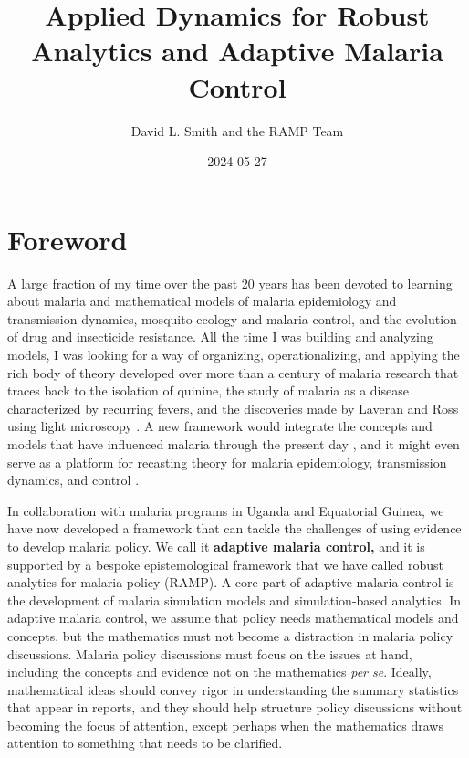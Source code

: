 \documentclass[
]{book}
\title{Applied Dynamics for Robust Analytics and Adaptive Malaria Control}
\author{David L. Smith and the RAMP Team}
\date{2024-05-27}
\begin{document}
\maketitle

{
\setcounter{tocdepth}{2}
\tableofcontents
}
\chapter*{Foreword}\label{foreword}

A large fraction of my time over the past 20 years has been devoted to learning about malaria and mathematical models of malaria epidemiology and transmission dynamics, mosquito ecology and malaria control, and the evolution of drug and insecticide resistance.
All the time I was building and analyzing models, I was looking for a way of organizing, operationalizing, and applying the rich body of theory developed over more than a century of malaria research that traces back to the isolation of quinine, the study of malaria as a disease characterized by recurring fevers, and the discoveries made by Laveran and Ross using light microscopy
\autocite{RossR1911Book,SmithDL2012_RossMacdonald}.
A new framework would integrate the concepts and models that have influenced malaria through the present day \autocite{ReinerRC2013SystematicReview,SmithNR2018AgentbasedModels}, and it might even serve as a platform for recasting theory for malaria epidemiology, transmission dynamics, and control \autocite{SmithDL2014Recasting}.

In collaboration with malaria programs in Uganda and Equatorial Guinea, we have now developed a framework that can tackle the challenges of using evidence to develop malaria policy.
We call it \textbf{adaptive malaria control,} and it is supported by a bespoke epistemological framework that we have called robust analytics for malaria policy (RAMP).
A core part of adaptive malaria control is the development of malaria simulation models and simulation-based analytics.
In adaptive malaria control, we assume that policy needs mathematical models and concepts, but the mathematics must not become a distraction in malaria policy discussions.
Malaria policy discussions must focus on the issues at hand, including the concepts and evidence not on the mathematics \emph{per se}.
Ideally, mathematical ideas should convey rigor in understanding the summary statistics that appear in reports, and they should help structure policy discussions without becoming the focus of attention, except perhaps when the mathematics draws attention to something that needs to be clarified.
\end{document}
